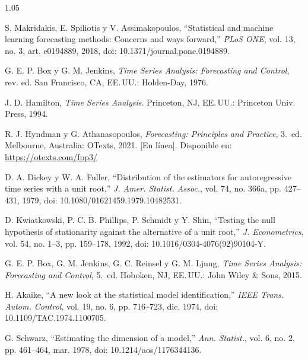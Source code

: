\documentclass[12pt,letterpaper]{report}
\begin{document}
\begin{spacing}{1.05}
\begin{enumerate}[label={[\arabic*]}, leftmargin=0.9cm, labelsep=0.3cm, itemsep=4pt, parsep=0pt, topsep=0pt]
    \item \label{bib:23} S. Makridakis, E. Spiliotis y V. Assimakopoulos, ``Statistical and machine learning forecasting methods: Concerns and ways forward,'' \textit{PLoS ONE}, vol. 13, no. 3, art. e0194889, 2018, doi: 10.1371/journal.pone.0194889.

    \item \label{bib:24} G. E. P. Box y G. M. Jenkins, \textit{Time Series Analysis: Forecasting and Control}, rev. ed. San Francisco, CA, EE.\,UU.: Holden-Day, 1976.

    \item \label{bib:25} J. D. Hamilton, \textit{Time Series Analysis}. Princeton, NJ, EE.\,UU.: Princeton Univ. Press, 1994.

    \item \label{bib:26} R. J. Hyndman y G. Athanasopoulos, \textit{Forecasting: Principles and Practice}, 3.\textordfeminine\ ed. Melbourne, Australia: OTexts, 2021. [En línea]. Disponible en: \url{https://otexts.com/fpp3/}

    \item \label{bib:27} D. A. Dickey y W. A. Fuller, ``Distribution of the estimators for autoregressive time series with a unit root,'' \textit{J. Amer. Statist. Assoc.}, vol. 74, no. 366a, pp. 427--431, 1979, doi: 10.1080/01621459.1979.10482531.

    \item \label{bib:28} D. Kwiatkowski, P. C. B. Phillips, P. Schmidt y Y. Shin, ``Testing the null hypothesis of stationarity against the alternative of a unit root,'' \textit{J. Econometrics}, vol. 54, no. 1--3, pp. 159--178, 1992, doi: 10.1016/0304-4076(92)90104-Y.

    \item \label{bib:29} G. E. P. Box, G. M. Jenkins, G. C. Reinsel y G. M. Ljung, \textit{Time Series Analysis: Forecasting and Control}, 5.\textordfeminine\ ed. Hoboken, NJ, EE.\,UU.: John Wiley \& Sons, 2015.

    \item \label{bib:30} H. Akaike, ``A new look at the statistical model identification,'' \textit{IEEE Trans. Autom. Control}, vol. 19, no. 6, pp. 716--723, dic. 1974, doi: 10.1109/TAC.1974.1100705.

    \item \label{bib:31} G. Schwarz, ``Estimating the dimension of a model,'' \textit{Ann. Statist.}, vol. 6, no. 2, pp. 461--464, mar. 1978, doi: 10.1214/aos/1176344136.


\end{enumerate}
\end{spacing}
\end{document}
